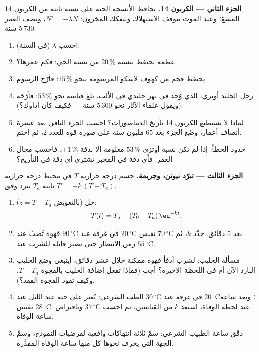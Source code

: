 \begin{problem}
\medskip
\noindent\textbf{الجزء الثاني --- الكربون 14.}
تحافظ الأنسجة الحية على نسبة ثابتة من الكربون 14
المشعّ؛ وعند الموت يتوقف الاستهلاك ويتفكك المخزون:
$N' = -\lambda N$، ونصف العمر $5\,730$ سنة.
\begin{enumerate}[resume]
  \item احسب $\lambda$ (في السنة).
  \item عظمة تحتفظ بنسبة $20\,\%$ من نسبة الحي: فكم عمرها؟
  \item يحتفظ فحم من كهوف لاسكو المرسومة
        بنحو $15\,\%$: فأرّخ الرسوم.
  \item رجل الجليد أوتزي، الذي وُجد في نهر جليدي في الألب، بلغ قياسه
        نحو $53\,\%$: فأرّخه (ويقول علماء الآثار نحو
        $5\,300$ سنة --- فكيف كان أداؤك؟).
  \item لماذا لا يستطيع الكربون 14 تأريخ الديناصورات؟ احسب
        الجزء الباقي بعد عشرة أنصاف أعمار، وصُغ
        الجزء بعد $65$ مليون سنة على صورة قوة للعدد $2$،
        ثم اختم.
  \item حدود الخطأ: إذا لم تكن نسبة أوتزي $53\,\%$ معلومة إلا بدقة
        $\pm 1\,\%$، فاحسب مجال العمر. فأي دقة في المخبر
        تشتري أي دقة في التأريخ؟
\end{enumerate}

\medskip
\noindent\textbf{الجزء الثالث --- تبرّد نيوتن، وجريمة.}
جسم درجة حرارته $T$ في محيط درجة حرارته ثابتة $T_a$
يبرد وفق $T' = -k\,(T - T_a)$.
\begin{enumerate}[resume]
  \item حل  (بالتعويض $z = T - T_a$):
        \[
        T(t) = T_a + (T_0 - T_a)\,\eu^{-kt} .
        \]
  \item قهوة تُصبّ عند $90\,^\circ$C في غرفة عند $20\,^\circ$C
        تقيس $70\,^\circ$C بعد $5$ دقائق. حدّد $k$،
        ثم زمن الانتظار حتى تصير قابلة للشرب عند
        $55\,^\circ$C.
  \item مسألة الحليب: لشرب أدفأ قهوة ممكنة
        خلال عشر دقائق، أينبغي وضع الحليب البارد الآن أم في
        اللحظة الأخيرة؟ أجب  (فماذا تفعل
        إضافة الحليب بالفجوة $T - T_a$، وكيف تقود
        الفجوة الفقد؟).
  \item الطب الشرعي: يُعثر على جثة عند  الليل عند
        $30\,^\circ$C في غرفة عند $20\,^\circ$C؛ وبعد ساعة
        تقيس $28\,^\circ$C. وبافتراض $37\,^\circ$C عند
        لحظة الوفاة، استعد $k$ من القياسين،
        ثم احسب ساعة الوفاة.
  \item دقّق ساعة الطبيب الشرعي: سمِّ ثلاثة انتهاكات واقعية
        لفرضيات النموذج، وسمِّ الجهة
        التي يحرف نحوها كل منها ساعة الوفاة المقدَّرة.
\end{enumerate}


\end{problem}
